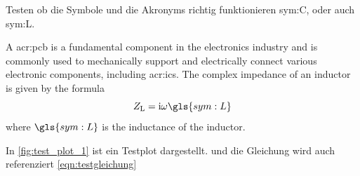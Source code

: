 Testen ob die Symbole und die Akronyms richtig funktionieren \gls{sym:C}, oder auch \gls{sym:L}.

A \gls{acr:pcb} is a fundamental component in the electronics industry and is commonly used to mechanically support and electrically connect various electronic components, including \glspl{acr:ic}. The complex impedance of an inductor is given by the formula
\begin{equation}
	Z_\mathrm{L}=\mathrm{i}\omega\gls{sym:L}
	\label{eqn:testgleichung}
\end{equation}
where $\gls{sym:L}$ is the inductance of the inductor.\par 
In \cref{fig:test_plot_1} ist ein Testplot dargestellt. und die Gleichung wird auch referenziert \cref{eqn:testgleichung}